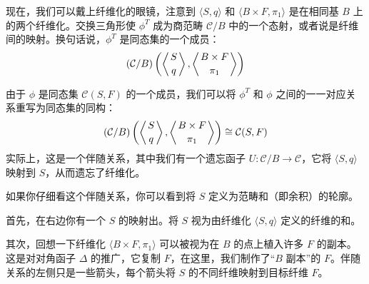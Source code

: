 \documentclass[DaoFP]{subfiles}
\begin{document}
  现在，我们可以戴上纤维化的眼镜，注意到 $\langle S, q\rangle$ 和 $\langle B \times F, \pi_1 \rangle$ 是在相同基 $B$ 上的两个纤维化。交换三角形使 $\phi^T$ 成为商范畴 $\mathcal{C}/B$ 中的一个态射，或者说是纤维间的映射。换句话说，$\phi^T$ 是同态集的一个成员：
  \[ (\mathcal{C}/B) \left(\left \langle {S \atop q} \right \rangle, \left \langle {B \times F \atop \pi_1} \right \rangle \right)  \]

  由于 $\phi$ 是同态集 $ \mathcal{C}(S, F)$ 的一个成员，我们可以将 $\phi^T$ 和 $\phi$ 之间的一一对应关系重写为同态集的同构：
  \[  (\mathcal{C}/B)\left(\left \langle {S \atop q} \right \rangle, \left \langle {B \times F \atop \pi_1} \right \rangle \right) \cong \mathcal{C}(S, F) \]
  实际上，这是一个伴随关系，其中我们有一个遗忘函子 $U \colon \mathcal{C}/B \to \mathcal{C}$，它将 $\langle S, q \rangle$ 映射到 $S$，从而遗忘了纤维化。

  如果你仔细看这个伴随关系，你可以看到将 $S$ 定义为范畴和（即余积）的轮廓。

  首先，在右边你有一个 $S$ 的映射出。将 $S$ 视为由纤维化 $\langle S, q \rangle$ 定义的纤维的和。

  其次，回想一下纤维化 $\langle B \times F, \pi_1 \rangle$ 可以被视为在 $B$ 的点上植入许多 $F$ 的副本。这是对对角函子 $\Delta$ 的推广，它复制 $F$，在这里，我们制作了“$B$ 副本”的 $F$。伴随关系的左侧只是一些箭头，每个箭头将 $S$ 的不同纤维映射到目标纤维 $F$。
\end{document}
